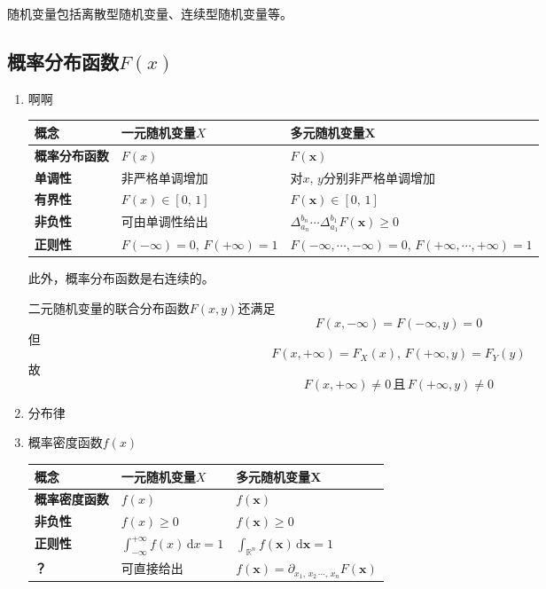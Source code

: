 \documentclass[UTF8,fontset=fandol,zihao=5]{ctexart}
\newcommand{\RR}{\mathbb{R}}
\newcommand{\dd}{\,\mathrm{d}}
\newcommand{\vect}[1]{\bm{#1}}
\begin{document}
随机变量包括离散型随机变量、连续型随机变量等。

\subsection{概率分布函数$F(x)$}

\begin{enumerate}
  \item 啊啊

\begin{center}
  \begin{tabularx}{0.92\textwidth}{>{\bfseries}p{2.3cm}X X}
    \toprule
    概念 & 一元随机变量$X$ & 多元随机变量$\vect X$ \\
    \midrule
    概率分布函数 & $F(x)$ & $F(\vect x)$ \\
    单调性 & 非严格单调增加 & 对$x,\, y$分别非严格单调增加 \\
    有界性 & $F(x) \in \left[ 0,\, 1 \right]$ & $F(\vect x) \in \left[ 0,\, 1 \right]$ \\
    非负性 & 可由单调性给出 & $\Delta_{a_n}^{b_n} \cdots \Delta_{a_1}^{b_1}F(\vect x) \geq 0$ \\
    正则性 & $F(-\infty)=0,\,F(+\infty)=1$ & $F(-\infty,\cdots,-\infty)=0,\,F(+\infty,\cdots,+\infty)=1$ \\
    \bottomrule
  \end{tabularx}
\end{center}

此外，概率分布函数是右连续的。

\begin{methodbox}[【注意】]
二元随机变量的联合分布函数$F(x,y)$还满足
\[
F(x, -\infty)=F(-\infty, y)=0
\]
但
\[
F(x, +\infty)=F_X(x),\, F(+\infty, y)=F_Y(y)
\]
故
\[
F(x, +\infty) \ne 0 \,\text{且}\, F(+\infty, y) \ne 0
\]
\end{methodbox}

  \item 分布律

  \item 概率密度函数$f(x)$

\begin{center}
  \begin{tabularx}{0.92\textwidth}{>{\bfseries}p{2.3cm}X X}
    \toprule
    概念 & 一元随机变量$X$ & 多元随机变量$\vect X$ \\
    \midrule
    概率密度函数 & $f(x)$ & $f(\vect x)$ \\
    非负性 & $f(x) \geq 0$ & $f(\vect x) \geq 0$ \\
    正则性 & $\displaystyle \int_{-\infty}^{+\infty} f(x)\dd x=1$ & $\displaystyle \int_{\RR^n} f(\vect x)\dd \vect x=1$ \\
    ？& 可直接给出 & $\displaystyle f(\vect x) = \partial_{x_1,\,x_2\,\cdots,\,x_n}F(\vect x)$ \\
    \bottomrule
  \end{tabularx}
\end{center}


\end{enumerate}
\end{document}
